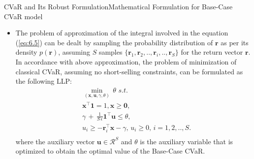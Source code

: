 \documentclass{beamer}
\begin{document}
\begin{frame}{CVaR and Its Robust Formulation}{Mathematical Formulation for Base-Case CVaR model}
\begin{itemize}
\item{The problem of approximation of the integral involved in the equation (\ref{eq:6.5}) can be dealt by sampling the probability distribution of $\mathbf{r}$ as per its density $p(\mathbf{r})$, assuming $S$ samples $\{ \mathbf{r}_{1}, \mathbf{r}_{2}, .., \mathbf{r}_{i},..,\mathbf{r}_{S}\}$ for the return vector $\mathbf{r}$. In accordance with above approximation, the problem of minimization of classical CVaR, assuming no short-selling constraints, can be formulated as the following LLP:
\begin{equation}
\label{eq:6.7}
\begin{split}
& \min_{(\mathbf{x},\mathbf{u},\gamma,\theta)} \, \theta \, \, s.t. \\
& \mathbf{x}^{\top}\mathbf{1}=1, \mathbf{x} \geq \mathbf{0}, \\
& \gamma \, + \, \frac{1}{S \, \epsilon} \mathbf{1}^{\top}\mathbf{u} \leq \theta, \\
& u_{i} \geq -\mathbf{r}_{i}^{\top}\mathbf{x}-\gamma, \, u_{i} \geq 0, \, i=1,2,..,S. \\
\end{split}
\end{equation}
where the auxiliary vector $\mathbf{u} \in \mathcal{R}^S$ and $\theta$ is the auxiliary variable that is optimized to obtain the optimal value of the Base-Case CVaR.}
\end{itemize}
\end{frame}
\end{document}
